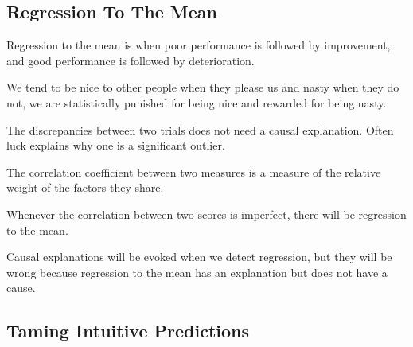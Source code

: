 \subsection*{Regression To The Mean}

\bit\item Regression to the mean is when poor performance is followed by improvement, and good performance is followed by
deterioration.
\item We tend to be nice to other people when they please us and nasty when they do not, we are statistically
punished for being nice and rewarded for being nasty.
\item The discrepancies between two trials does not need a causal explanation. Often luck explains why one is a
significant outlier.
\item The correlation coefficient between two measures is a measure of the relative weight of the factors they share.
\item Whenever the correlation between two scores is imperfect, there will be regression to the mean.
\item Causal explanations will be evoked when we detect regression, but they will be wrong because regression to the
mean has an explanation but does not have a cause.
\eit

\subsection*{Taming Intuitive Predictions}

